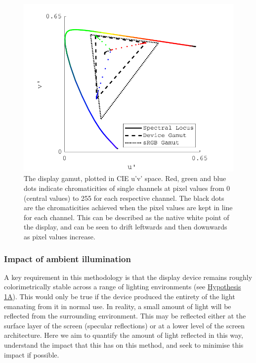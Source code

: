 \begin{figure}[hbtp]
\includegraphics[max width=\textwidth]{figs/tablet/gamut.pdf}
\caption{The display gamut, plotted in CIE u'v' space. Red, green and blue dots indicate chromaticities of single channels at pixel values from 0 (central values) to 255 for each respective channel. The black dots are the chromaticities achieved when the pixel values are kept in line for each channel. This can be described as the native white point of the display, and can be seen to drift leftwards and then downwards as pixel values increase.}
\label{fig:gamut}
\end{figure}

\subsubsection{Impact of ambient illumination} \label{sec:ambient}

A key requirement in this methodology is that the display device remains roughly colorimetrically stable across a range of lighting environments (see \hyperref[list:hyp1a]{Hypothesis 1A}). This would only be true if the device produced the entirety of the light emanating from it in normal use. In reality, a small amount of light will be reflected from the surrounding environment. This may be reflected either at the surface layer of the screen (specular reflections) or at a lower level of the screen architecture. Here we aim to quantify the amount of light reflected in this way, understand the impact that this has on this method, and seek to minimise this impact if possible.

